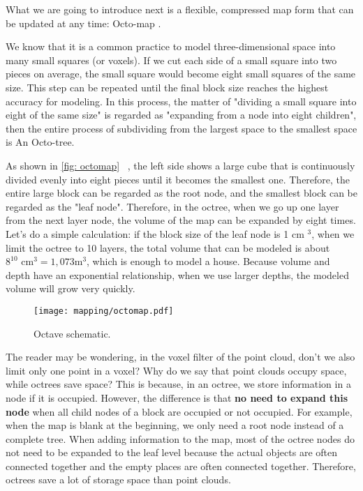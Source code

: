 What we are going to introduce next is a flexible, compressed map form that can be updated at any time: Octo-map \textsuperscript{\cite{Hornung2013}}.

We know that it is a common practice to model three-dimensional space into many small squares (or voxels). If we cut each side of a small square into two pieces on average, the small square would become eight small squares of the same size. This step can be repeated until the final block size reaches the highest accuracy for modeling. In this process, the matter of "dividing a small square into eight of the same size" is regarded as "expanding from a node into eight children", then the entire process of subdividing from the largest space to the smallest space is An Octo-tree.

As shown in \autoref{fig: octomap} ~, the left side shows a large cube that is continuously divided evenly into eight pieces until it becomes the smallest one. Therefore, the entire large block can be regarded as the root node, and the smallest block can be regarded as the "leaf node". Therefore, in the octree, when we go up one layer from the next layer node, the volume of the map can be expanded by eight times. Let's do a simple calculation: if the block size of the leaf node is 1 cm $ ^ 3 $, when we limit the octree to 10 layers, the total volume that can be modeled is about $ 8 ^{10} \text{ cm} ^ 3=1,073 \text{m} ^ 3 $, which is enough to model a house. Because volume and depth have an exponential relationship, when we use larger depths, the modeled volume will grow very quickly.

\begin{figure}[! ht]
\centering
\texttt{[image: mapping/octomap.pdf]}
\caption{Octave schematic. }
\label{fig: octomap}
\end{figure}

The reader may be wondering, in the voxel filter of the point cloud, don't we also limit only one point in a voxel? Why do we say that point clouds occupy space, while octrees save space? This is because, in an octree, we store information in a node if it is occupied. However, the difference is that \textbf{no need to expand this node} when all child nodes of a block are occupied or not occupied. For example, when the map is blank at the beginning, we only need a root node instead of a complete tree. When adding information to the map, most of the octree nodes do not need to be expanded to the leaf level because the actual objects are often connected together and the empty places are often connected together. Therefore, octrees save a lot of storage space than point clouds.

